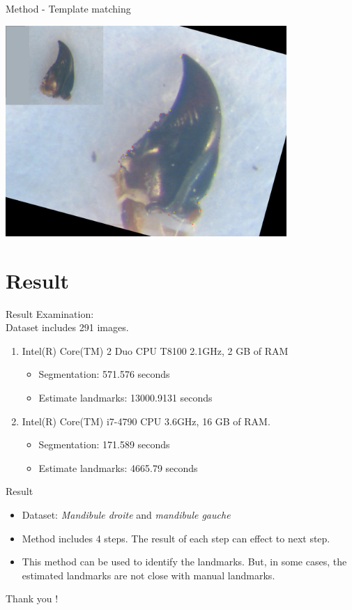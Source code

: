 \documentclass{beamer}
\begin{document}
\begin{frame}{Method - Template matching}
	\begin{center}
		\includegraphics[height=8cm]{images/est19.JPG}	
	\end{center}
\end{frame}
\section{Result}
\begin{frame}Result
	Examination: \\[0.3cm]
	Dataset includes 291 images.
	\begin{enumerate}
		\item Intel(R) Core(TM) 2 Duo CPU T8100 2.1GHz, 2 GB of RAM
		\begin{itemize}
			\item Segmentation: 571.576 seconds
			\item Estimate landmarks: 13000.9131 seconds
		\end{itemize}
		\item Intel(R) Core(TM) i7-4790 CPU 3.6GHz, 16 GB of RAM.
		\begin{itemize}
			\item Segmentation: 171.589 seconds
			\item Estimate landmarks: 4665.79 seconds
		\end{itemize}
	\end{enumerate}
\end{frame}
\begin{frame}{Result}
	\begin{itemize}
		\item Dataset: \textit{Mandibule droite} and \textit{mandibule gauche}
		\item Method includes 4 steps. The result of each step can effect to next step.
		\item This method can be used to identify the landmarks. But, in some cases, the estimated landmarks are not close with manual landmarks.
	\end{itemize}
\end{frame}
\begin{frame}[plain]
  \Huge{\centerline{Thank you !}}
\end{frame}
\end{document}
